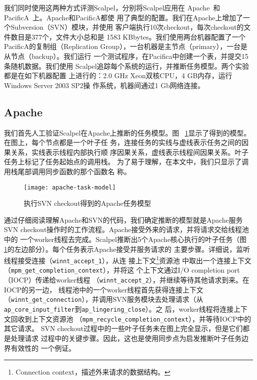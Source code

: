 我们同时使用这两种方式评测Scalpel，分别将Scalpel应用在
Apache~\cite{apache}和PacificA~\cite{pacifica}上。Apache和PacificA都使
用了典型的配置。我们在Apache上增加了一个Subversion（SVN）模块，并使用
客户端执行10次checkout，每次checkout的文件数目是377个，文件大小总和是
1583 KBbytes。我们使用两台机器配置了一个PacificA的复制组（Replication
Group），一台机器是主节点（primary），一台是从节点（backup）。我们运行
一个测试程序，在Pacifica中创建一个表，并提交15条随机数据。我们使用
Scalpel追踪每个系统的运行，并推断任务模型。两个实验都是在如下机器配置
上进行的：2.0 GHz Xeon双核CPU，4 GB内存，运行Windows Server 2003 SP2操
作系统，机器间通过1 Gb网络连接。

\subsection{Apache}

我们首先人工验证Scalpel在Apache上推断的任务模型。图~
\ref{fig:apache_model}显示了得到的模型。在图上，每个节点都是一个叶子任
务，连接任务的实线与虚线表示任务之间的因果关系，实线表示线程内部执行顺
序因果关系，虚线表示线程间因果关系。叶子任务上标记了任务起始点的调用栈。
为了易于理解，在本文中，我们只显示了调用栈尾部调用同步函数的那个函数名
称。

\begin{figure}
\centering
\texttt{[image: apache-task-model]}
\caption{执行SVN checkout得到的Apache任务模型}
\label{fig:apache_model}
\end{figure}


通过仔细阅读理解Apache和SVN的代码，我们确定推断的模型就是Apache服务SVN
checkout操作时的工作流程。Apache接受外来的请求，并将请求交给线程池中的
一个worker线程去完成。Scalpel推断出5个Apache核心执行的叶子任务（图~
\ref{fig:apache_model}的左边部分）。每个任务表示Apache接受并服务请求的
主要步骤。详细说，监听线程接受连接（\texttt{winnt\_accept\_1}），从连
接上下文\footnote{Connection context，描述外来请求的数据结构。}资源池
中取出一个连接上下文（\texttt{mpm\_get\_completion\_context}），并将这
个上下文通过I/O completion port（IOCP）传递给worker线程
（\texttt{winnt\_accept\_2}），并继续等待其他请求到来。在IOCP的另一边，
线程池中的一个worker线程首先获得连接上下文
（\texttt{winnt\_get\_connection}），并调用SVN服务模块去处理请求（从
\texttt{ap\_core\_input\_filter}到\texttt{ap\_lingering\_close}）。之
后，worker线程将连接上下文回收到上下文资源池
（\texttt{mpm\_recycle\_completion\_context}），并等待IOCP中的其它请求。
SVN checkout过程中的一些叶子任务未在图上完全显示，但是它们都是处理请求
过程中的关键步骤。因此，这也是使用同步点为启发推断叶子任务边界有效性的
一个例证。

